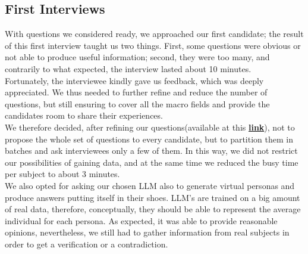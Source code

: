 \subsection{First Interviews}
With questions we considered ready, we approached our first candidate; the result of this first interview taught us two things. First, some questions were obvious or not able to produce useful information; second, they were too many, and contrarily to what expected, the interview lasted about 10 minutes.\\
Fortunately, the interviewee kindly gave us feedback, which was deeply appreciated. We thus needed to further refine and reduce the number of questions, but still ensuring to cover all the macro fields and provide the candidates room to share their experiences.\\
We therefore decided, after refining our questions(available at this \href{https://docs.google.com/document/d/1L25VnXD9_-V7enQ3jEuFU-7WAiuKRug0KEyd9jIrUYU/edit?usp=sharing}{\textbf{link}}), not to propose the whole set of questions to every candidate, but to partition them in batches and ask interviewees only a few of them. In this way, we did not restrict our possibilities of gaining data, and at the same time we reduced the busy time per subject to about 3 minutes.\\
We also opted for asking our chosen LLM also to generate virtual personas and produce answers putting itself in their shoes. LLM's are trained on a big amount of real data, therefore, conceptually, they should be able to represent the average individual for each persona. As expected, it was able to provide reasonable opinions, nevertheless, we still had to gather information from real subjects in order to get a verification or a contradiction.
